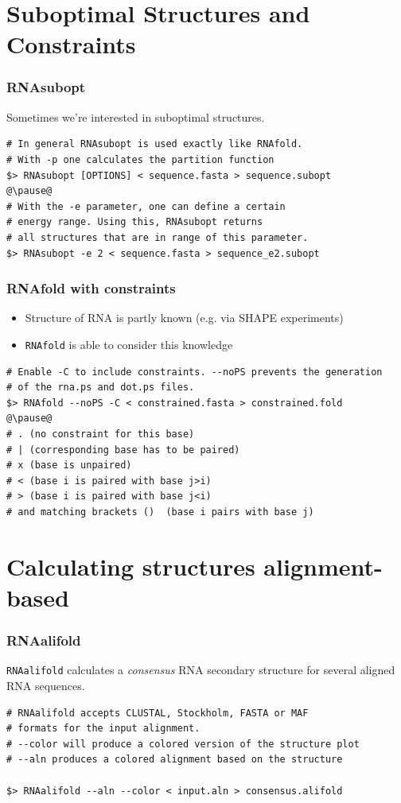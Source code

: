\section[Plausible Structures]{Suboptimal Structures and Constraints}

\begin{frame}[c, fragile]\frametitle{RNAsubopt}
\begin{overlayarea}{\textwidth}{0.7\textheight}
Sometimes we're interested in suboptimal structures.

  \begin{lstlisting}
# In general RNAsubopt is used exactly like RNAfold.
# With -p one calculates the partition function
$> RNAsubopt [OPTIONS] < sequence.fasta > sequence.subopt
@\pause@
# With the -e parameter, one can define a certain
# energy range. Using this, RNAsubopt returns
# all structures that are in range of this parameter.
$> RNAsubopt -e 2 < sequence.fasta > sequence_e2.subopt
  \end{lstlisting}
\end{overlayarea}

\end{frame}

\begin{frame}[c, fragile]\frametitle{RNAfold with constraints}
  \begin{itemize}
      \item Structure of RNA is partly known (e.g. via SHAPE experiments)
      \item \texttt{RNAfold} is able to consider this knowledge
  \end{itemize}

  \begin{lstlisting}
# Enable -C to include constraints. --noPS prevents the generation
# of the rna.ps and dot.ps files.
$> RNAfold --noPS -C < constrained.fasta > constrained.fold
@\pause@
# . (no constraint for this base)
# | (corresponding base has to be paired)
# x (base is unpaired)
# < (base i is paired with base j>i)
# > (base i is paired with base j<i)
# and matching brackets ()  (base i pairs with base j)
  \end{lstlisting}
\end{frame}


\section[Alignments]{Calculating structures alignment-based}

\begin{frame}[c, fragile]\frametitle{RNAalifold}
  \texttt{RNAalifold} calculates a \emph{consensus} RNA secondary structure for several aligned RNA sequences.
\begin{lstlisting}
# RNAalifold accepts CLUSTAL, Stockholm, FASTA or MAF
# formats for the input alignment.
# --color will produce a colored version of the structure plot
# --aln produces a colored alignment based on the structure

$> RNAalifold --aln --color < input.aln > consensus.alifold
\end{lstlisting}
\end{frame}

